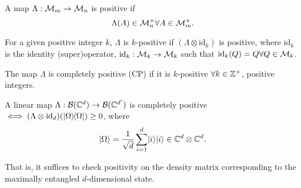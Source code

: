 \begin{defn}
    A map $\Lambda:\mathcal{M}_m\to \mathcal{M}_n$ is positive if
    \begin{equation}
        \Lambda(A)\in \mathcal{M}_n^+ \forall A \in \mathcal{M}_m^+.
    \end{equation}
\end{defn}
\begin{defn}
    For a given positive integer $k$, $\Lambda$ is $k$-positive if
    $(\Lambda \otimes \text{id}_k)$ is positive, where $\text{id}_k$ is the identity (super)operator, $\text{id}_k:\mathcal{M}_k \to \mathcal{M}_k$ such that $\text{id}_k(Q)=Q \forall Q\in \mathcal{M}_k$.
\end{defn}
\begin{defn}
    The map $\Lambda$ is completely positive (CP) if it is $k$-positive $\forall k\in \mathbb{Z}^+$, positive integers.
\end{defn}
\begin{thm}
    A linear map $\Lambda:\mathcal{B}(\mathbb{C}^d)\to \mathcal{B}(\mathbb{C}^{d'})$ is completely positive $\iff (\Lambda \otimes \text{id}_d)(\left\lvert \Omega \middle\rangle\!\middle\langle \Omega \right\rvert)\geq 0$, where
    \begin{equation}
        \lvert\Omega\rangle=\frac{1}{\sqrt{d}}\sum_{i=1}^d \lvert i\rangle\lvert i\rangle \in \mathbb{C}^d \otimes \mathbb{C}^d.
    \end{equation}
\end{thm}
That is, it suffices to check positivity on the density matrix corresponding to the maximally entangled $d$-dimensional state.
